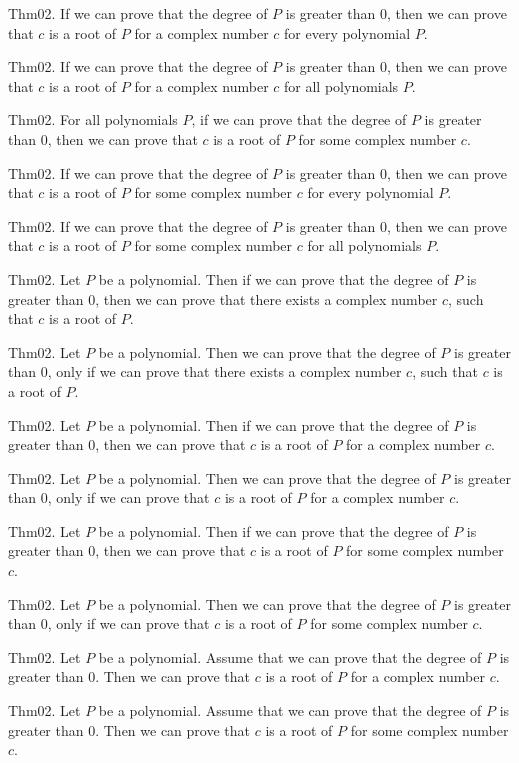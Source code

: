 \documentclass{article}
\begin{document}
Thm02. If we can prove that the degree of $P$ is greater than $0$, then we can prove that $c$ is a root of $P$ for a complex number $c$ for every polynomial $P$.

Thm02. If we can prove that the degree of $P$ is greater than $0$, then we can prove that $c$ is a root of $P$ for a complex number $c$ for all polynomials $P$.

Thm02. For all polynomials $P$, if we can prove that the degree of $P$ is greater than $0$, then we can prove that $c$ is a root of $P$ for some complex number $c$.

Thm02. If we can prove that the degree of $P$ is greater than $0$, then we can prove that $c$ is a root of $P$ for some complex number $c$ for every polynomial $P$.

Thm02. If we can prove that the degree of $P$ is greater than $0$, then we can prove that $c$ is a root of $P$ for some complex number $c$ for all polynomials $P$.

Thm02. Let $P$ be a polynomial. Then if we can prove that the degree of $P$ is greater than $0$, then we can prove that there exists a complex number $c$, such that $c$ is a root of $P$.

Thm02. Let $P$ be a polynomial. Then we can prove that the degree of $P$ is greater than $0$, only if we can prove that there exists a complex number $c$, such that $c$ is a root of $P$.

Thm02. Let $P$ be a polynomial. Then if we can prove that the degree of $P$ is greater than $0$, then we can prove that $c$ is a root of $P$ for a complex number $c$.

Thm02. Let $P$ be a polynomial. Then we can prove that the degree of $P$ is greater than $0$, only if we can prove that $c$ is a root of $P$ for a complex number $c$.

Thm02. Let $P$ be a polynomial. Then if we can prove that the degree of $P$ is greater than $0$, then we can prove that $c$ is a root of $P$ for some complex number $c$.

Thm02. Let $P$ be a polynomial. Then we can prove that the degree of $P$ is greater than $0$, only if we can prove that $c$ is a root of $P$ for some complex number $c$.

Thm02. Let $P$ be a polynomial. Assume that we can prove that the degree of $P$ is greater than $0$. Then we can prove that $c$ is a root of $P$ for a complex number $c$.

Thm02. Let $P$ be a polynomial. Assume that we can prove that the degree of $P$ is greater than $0$. Then we can prove that $c$ is a root of $P$ for some complex number $c$.
\end{document}
